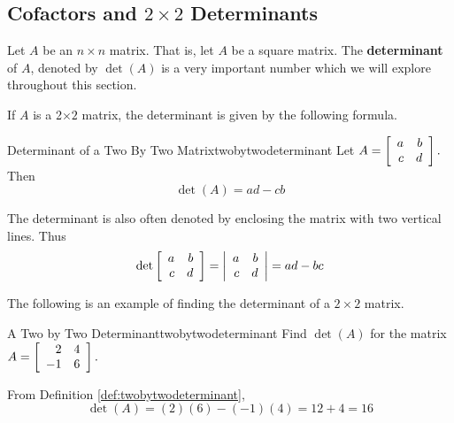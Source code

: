 \subsection{Cofactors and \texorpdfstring{$2\times 2$}{2x2} Determinants}

Let $A$ be an $n\times n$ matrix. That is, let $A$ be a square matrix. The \textbf{determinant}  of $A$, denoted
by $\det \left( A\right) $ is a very important number which we will explore throughout this section. 

If $A$ is a 2$\times 2$
matrix, the determinant is given by the following formula.

\begin{definition}{Determinant of a Two By Two Matrix}{twobytwodeterminant}
Let $A=\left[
\begin{array}{rr}
a & b \\
c & d
\end{array}
\right] .$ Then
\begin{equation*}
\det \left( A\right)  = ad-cb
\end{equation*}
\end{definition}

The determinant is also often denoted by enclosing the matrix with two
vertical lines. Thus
\begin{equation*}
\det \left[
\begin{array}{rr}
a & b \\
c & d
\end{array}
\right] =\left|
\begin{array}{rr}
a & b \\
c & d
\end{array}
\right| 
=ad - bc
\end{equation*}

The following is an example of finding the determinant of a $2 \times 2$ matrix.

\begin{example}{A Two by Two Determinant}{twobytwodeterminant}
Find $\det\left(A\right) $ for the matrix
$A =  \left[
\begin{array}{rr}
2 & 4 \\
-1 & 6
\end{array}
\right] .$
\end{example}

\begin{solution} From Definition \ref{def:twobytwodeterminant},
\begin{equation*}
\det \left( A\right) = \left( 2\right) \left( 6\right) -\left(
-1\right) \left( 4\right) = 12 + 4 = 16
\end{equation*}
\end{solution} 

